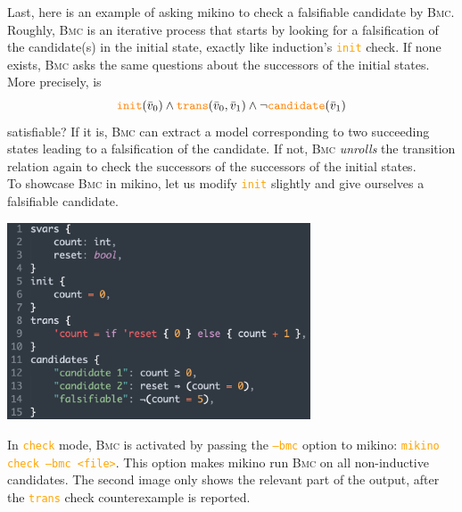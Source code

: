 \documentclass{easychair}
\newcommand{\mkn}{mikino}
\newcommand{\bmc}{\textsc{Bmc}}
\newcommand{\ita}[1]{\textit{#1}}
\newcommand{\code}[1]{\textcolor{orange}{\texttt{#1}}}
\newcommand{\picwidth}{9cm}
\newcommand{\vars}{\bar{v}}
\newcommand{\init}{\code{init}}
\newcommand{\trans}{\code{trans}}
\newcommand{\cand}{\code{candidate}}
\begin{document}
Last, here is an example of asking \mkn{} to check a falsifiable candidate by \bmc{}. 
Roughly, \bmc{} is an iterative process that starts by looking for
a falsification of the candidate(s) in the initial state, exactly like induction's \init{} check.
If none exists, \bmc{} asks the same questions about the successors of the initial states. More
precisely, is%
%
\[
    \init(\vars_0) \land \trans(\vars_0, \vars_1) \land \neg \cand(\vars_1)
\]
%
satisfiable? If it is, \bmc{} can extract a model corresponding to two succeeding states leading to
a falsification of the candidate. If not, \bmc{} \ita{unrolls} the transition relation again to
check the successors of the successors of the initial states.
%
\\
%
To showcase \bmc{} in \mkn{}, let us modify \init{} slightly and give ourselves a falsifiable
candidate.
%
\begin{center}
    \includegraphics[width=\picwidth]{../rsc/stopwatch_3.png}
\end{center}

In \code{check} mode, \bmc{} is activated by passing the \code{--bmc} option to \mkn{}:
\code{mikino check --bmc <file>}. This option makes \mkn{} run \bmc{} on all non-inductive
candidates. The second image only shows the relevant part of the output, after the \trans{} check
counterexample is reported.
\end{document}
